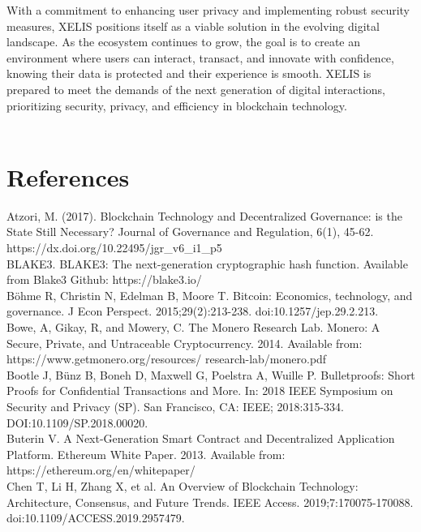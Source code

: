 \documentclass[12pt,a4paper,twocolumn]{article}
\begin{document}
With a commitment to enhancing user privacy and implementing robust security measures, XELIS positions itself as a viable solution in the evolving digital landscape. As the ecosystem continues to grow, the goal is to create an environment where users can interact, transact, and innovate with confidence, knowing their data is protected and their experience is smooth. XELIS is prepared to meet the demands of the next generation of digital interactions, prioritizing security, privacy, and efficiency in blockchain technology.\\

\newpage
~\newpage

\section{References}

Atzori, M. (2017). Blockchain Technology and Decentralized Governance: is the State Still Necessary? Journal of Governance and Regulation, 6(1), 45-62. https://dx.doi.org/10.22495/jgr\_v6\_i1\_p5 \\

BLAKE3. BLAKE3: The next-generation cryptographic hash function. Available from Blake3 Github: https://blake3.io/\\

Böhme R, Christin N, Edelman B, Moore T. Bitcoin: Economics, technology, and governance. J Econ Perspect. 2015;29(2):213-238. doi:10.1257/jep.29.2.213.\\

Bowe, A, Gikay, R, and Mowery, C. The Monero Research Lab. Monero: A Secure, Private, and Untraceable Cryptocurrency. 2014. Available from: https://www.getmonero.org/resources/ research-lab/monero.pdf \\

Bootle J, Bünz B, Boneh D, Maxwell G, Poelstra A, Wuille P. Bulletproofs: Short Proofs for Confidential Transactions and More. In: 2018 IEEE Symposium on Security and Privacy (SP). San Francisco, CA: IEEE; 2018:315-334. DOI:10.1109/SP.2018.00020.\\

Buterin V. A Next-Generation Smart Contract and Decentralized Application Platform. Ethereum White Paper. 2013. Available from: https://ethereum.org/en/whitepaper/\\

Chen T, Li H, Zhang X, et al. An Overview of Blockchain Technology: Architecture, Consensus, and Future Trends. IEEE Access. 2019;7:170075-170088. doi:10.1109/ACCESS.2019.2957479.\\
\end{document}
